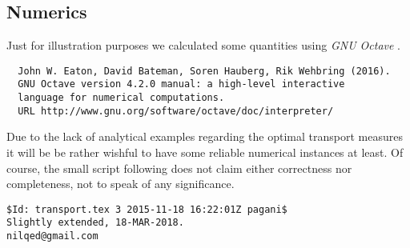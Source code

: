 \documentclass[12pt,a4paper]{article}
\begin{document}
\begin{appendices}
\subsection{Numerics}
Just for illustration purposes we calculated some quantities using {\sl GNU Octave}
\cite{octave}.
{\small
\begin{verbatim}
  John W. Eaton, David Bateman, Soren Hauberg, Rik Wehbring (2016).
  GNU Octave version 4.2.0 manual: a high-level interactive 
  language for numerical computations.
  URL http://www.gnu.org/software/octave/doc/interpreter/
\end{verbatim}
}
Due to the lack of analytical examples regarding the optimal transport measures
it will be be rather wishful to have some reliable numerical instances at least. 
Of course, the small script following does not claim either correctness nor completeness,
not to speak of any significance. 



\end{appendices}
\newpage


%
\texttt{\tiny \$Id: transport.tex 3 2015-11-18 16:22:01Z pagani\$}\\
\texttt{\tiny Slightly extended, 18-MAR-2018.}\\
\texttt{\tiny nilqed@gmail.com}
\end{document}
